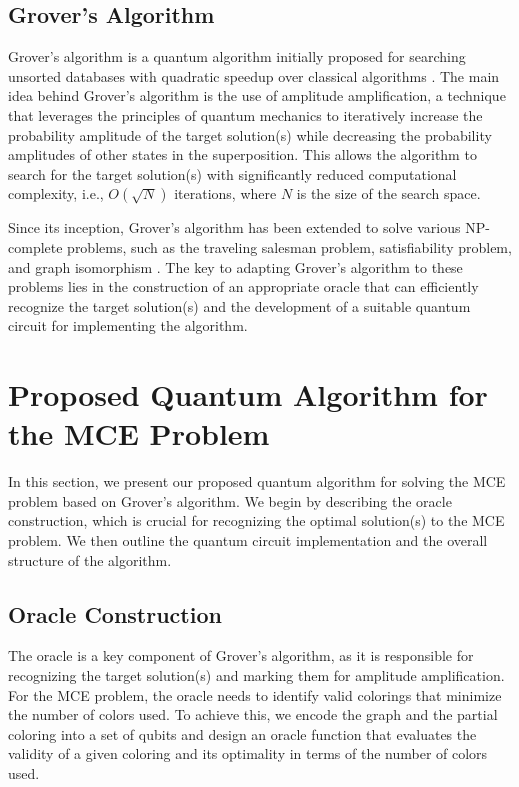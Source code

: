 \subsection{Grover's Algorithm}

Grover's algorithm is a quantum algorithm initially proposed for searching unsorted databases with quadratic speedup over classical algorithms \cite{grover}. The main idea behind Grover's algorithm is the use of amplitude amplification, a technique that leverages the principles of quantum mechanics to iteratively increase the probability amplitude of the target solution(s) while decreasing the probability amplitudes of other states in the superposition. This allows the algorithm to search for the target solution(s) with significantly reduced computational complexity, i.e., $O(\sqrt{N})$ iterations, where $N$ is the size of the search space.

Since its inception, Grover's algorithm has been extended to solve various NP-complete problems, such as the traveling salesman problem, satisfiability problem, and graph isomorphism \cite{grovernp1, grovernp2, grovernp3}. The key to adapting Grover's algorithm to these problems lies in the construction of an appropriate oracle that can efficiently recognize the target solution(s) and the development of a suitable quantum circuit for implementing the algorithm.

\section{Proposed Quantum Algorithm for the MCE Problem}
\label{sec:algorithm}

In this section, we present our proposed quantum algorithm for solving the MCE problem based on Grover's algorithm. We begin by describing the oracle construction, which is crucial for recognizing the optimal solution(s) to the MCE problem. We then outline the quantum circuit implementation and the overall structure of the algorithm.

\subsection{Oracle Construction}

The oracle is a key component of Grover's algorithm, as it is responsible for recognizing the target solution(s) and marking them for amplitude amplification. For the MCE problem, the oracle needs to identify valid colorings that minimize the number of colors used. To achieve this, we encode the graph and the partial coloring into a set of qubits and design an oracle function that evaluates the validity of a given coloring and its optimality in terms of the number of colors used.

